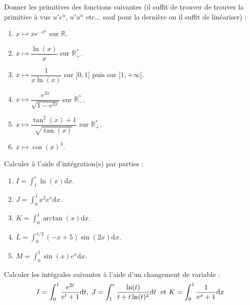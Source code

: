 \documentclass[a4paper,twoside,french,11pt]{VcCours}
\newcommand{\dx}{\text{d}x}
\newcommand{\dt}{\text{d}t}
\begin{document}
\begin{Exercice}{}
  Donner les primitives des fonctions suivantes (il suffit de trouver de trouver la primitive \og à vue \fg $u'e^{u}$, $u'u^n$ etc... sauf pour la dernière ou il suffit de linéariser) :

  \begin{multicols}{2}
    \begin{enumerate}
      \item $x \mapsto xe^{-x^2}$ sur $\mathbb{R}$.
      \item $x \mapsto \dfrac{\ln(x)}{x}$ sur $\mathbb{R}_{+}^*$.
      \item $x \mapsto \dfrac{1}{x\ln(x)}$ sur $]0,1[$ puis sur $]1, + \infty[$.
      \columnbreak
      \item $x \mapsto \dfrac{e^{2x}}{\sqrt{1-e^{2x}}}$ sur $\mathbb{R}_{-}^*$.
      \item $x \mapsto \dfrac{\tan^2(x)+1}{\sqrt{\tan(x)}}$ sur $\mathbb{R}_{+}^*$.
      \item $x \mapsto \cos(x)^3$.
    \end{enumerate}
  \end{multicols}
\end{Exercice} 

\begin{Exercice}{}
  Calculer à l'aide d'intégration(s) par parties :

  \begin{multicols}{2}
    \begin{enumerate}
      \item $I= \int_{1}^e \ln(x) \dx$.
      \item $J= \int_{0}^1 x^2 e^x \dx$.
      \item $K = \int_{0}^{1} \arctan(x) \dx$.
      \columnbreak
      \item $L = \int_{0}^{\pi/2} (-x+5) \sin(2x) \dx$.
      \item $M = \int_{0}^1 \sin(x) e^x \dx$.
    \end{enumerate}
  \end{multicols}
\end{Exercice} 

\begin{Exercice}{}
  Calculer les intégrales suivantes à l'aide d'un changement de variable :
  $$I= \int_{0}^1 \dfrac{e^{2t}}{e^t+1} \dt, \; J = \int_{1}^e \dfrac{\ln(t)}{t+t\ln(t)^2} \dt \; \hbox{ et } K = \int_{0}^1 \dfrac{1}{e^x+1} \dx$$
\end{Exercice} 
\end{document}
